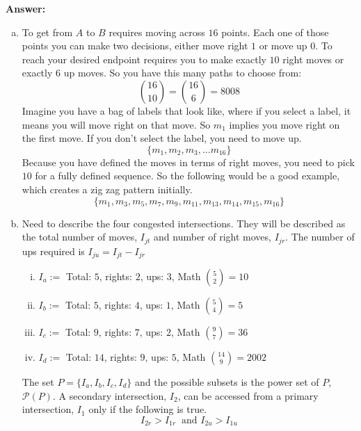 \documentclass{article}
\begin{document}
\textbf{Answer:} 
\begin{enumerate}[(a)]
    \item To get from $A$ to $B$ requires moving across $16$ points. Each one of those points you can make two decisions, either move right $1$ or move up $0$. To reach your desired endpoint requires you to make exactly $10$ right moves or exactly $6$ up moves. So you have this many paths to choose from:
    \begin{equation*}
        \binom{16}{10} = \binom{16}{6} = 8008
    \end{equation*}
    Imagine you have a bag of labels that look like, where if you select a label, it means you will move right on that move. So $m_1$ implies you move right on the first move. If you don't select the label, you need to move up.
    \begin{equation*}
        \{m_1, m_2, m_3, \dots m_{16}\}
    \end{equation*}
    Because you have defined the moves in terms of right moves, you need to pick $10$ for a fully defined sequence. So the following would be a good example, which creates a zig zag pattern initially.
    \begin{equation*}
        \{m_1, m_3, m_5, m_7, m_9, m_{11}, m_{13}, m_{14}, m_{15}, m_{16}\}
    \end{equation*}
    \item Need to describe the four congested intersections. They will be described as the total number of moves, $I_{jt}$ and number of right moves, $I_{jr}$. The number of ups required is $I_{ju} = I_{jt} - I_{jr}$
    \begin{enumerate}[(i)]
        \item $I_a :=$ Total: $5$, rights: $2$, ups: $3$, Math $\binom{5}{2} = 10$
        \item $I_b :=$ Total: $5$, rights: $4$, ups: $1$, Math $\binom{5}{4} = 5$
        \item $I_c :=$ Total: $9$, rights: $7$, ups: $2$, Math $\binom{9}{7} = 36$
        \item $I_d :=$ Total: $14$, rights: $9$, ups: $5$, Math $\binom{14}{9} = 2002$ 
    \end{enumerate}
    The set $P = \{I_a, I_b, I_c, I_d\}$ and the possible subsets is the power set of $P$, $\mathscr{P}(P)$. A secondary intersection, $I_2$, can be accessed from a primary intersection, $I_1$ only if the following is true.
    \begin{equation*}
        I_{2r} > I_{1r} \: \text{ and } I_{2u} > I_{1u}

\end{equation*}
\end{enumerate}
\end{document}
